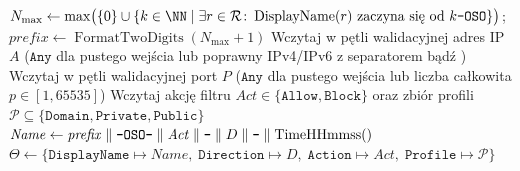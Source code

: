 \begin{algorithm}[H]
    \caption{Walidacja parametrów, dobór profilu sieciowego i rejestracja nowej reguły zapory}\label{alg:tworzenie-reguly}
    $N_{\max} \leftarrow \max\bigl(\{0\} \cup \{k \in \NN \mid \exists r \in \mathcal{R}\colon \operatorname{DisplayName}(r) \text{ zaczyna się od } k\text{\texttt{-OSO}}\}\bigr)$;\;
    $\mathit{prefix} \leftarrow \operatorname{FormatTwoDigits}(N_{\max} + 1)$\;
    Wczytaj w pętli walidacyjnej adres IP $A$ ($\texttt{Any}$ dla pustego wejścia lub poprawny IPv4/IPv6 z separatorem  bądź \code{:})\;
    Wczytaj w pętli walidacyjnej port $P$ ($\texttt{Any}$ dla pustego wejścia lub liczba całkowita $p \in [1, 65535]$)\;
    Wczytaj akcję filtru $\mathit{Act} \in \{\texttt{Allow}, \texttt{Block}\}$ oraz zbiór profili $\mathcal{P} \subseteq \{\texttt{Domain}, \texttt{Private}, \texttt{Public}\}$\;
    $\mathit{Name} \leftarrow \mathit{prefix} \parallel \text{\texttt{-OSO-}} \parallel \mathit{Act} \parallel \text{\texttt{-}} \parallel D \parallel \text{\texttt{-}} \parallel \operatorname{TimeHHmmss}()$\;
    $\Theta \leftarrow \{\texttt{DisplayName} \mapsto \mathit{Name},\; \texttt{Direction} \mapsto D,\; \texttt{Action} \mapsto \mathit{Act},\; \texttt{Profile} \mapsto \mathcal{P}\}$\;
    \;
\end{algorithm}


